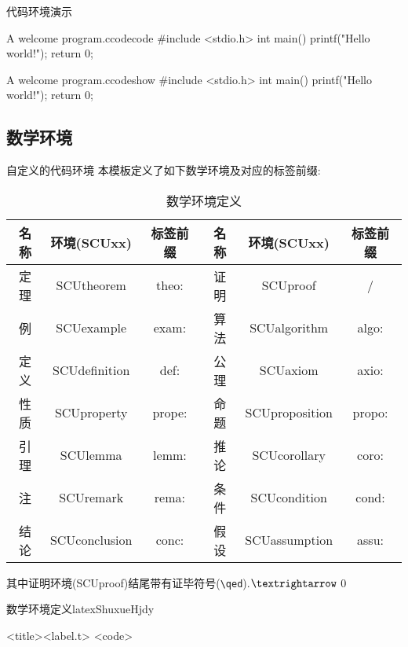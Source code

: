\documentclass[hyperref,UTF8,11pt]{beamer}
\begin{document}
\begin{frame}[fragile]{代码环境演示}
	\begin{SCUcode}[]{A welcome program.}{c}{}{codecode}
		#include <stdio.h>
		int main() {
			printf("Hello world!\n");
			return 0;
		}
	\end{SCUcode}
	\begin{SCUshow}[]{A welcome program.}{c}{}{codeshow}
		#include <stdio.h>
		int main() {
			printf("Hello world!\n");
			return 0;
		}
	\end{SCUshow}
\end{frame}

\subsection{数学环境}
\begin{frame}{自定义的代码环境}
	本模板定义了如下数学环境及对应的标签前缀: 
	\begin{table}[htbp!]
		\centering\scriptsize
		\caption{数学环境定义}
		\label{tab:ShuxueHjdy}
		\begin{tabular}{ccc|ccc}
			\toprule
			名称 & 环境(SCUxx) & 标签前缀 & 名称 & 环境(SCUxx) & 标签前缀 \\
			\midrule
			定理 & \color{JXred}SCUtheorem & theo: & 证明 & \color{JXred}SCUproof & / \\
			例 & \color{JXred}SCUexample & exam: & 算法 & \color{JXred}SCUalgorithm & algo: \\
			定义 & \color{JXred}SCUdefinition & def: & 公理 & \color{JXred}SCUaxiom & axio: \\
			性质 & \color{JXred}SCUproperty & prope: & 命题 & \color{JXred}SCUproposition & propo: \\
			引理 & \color{JXred}SCUlemma & lemm: & 推论 & \color{JXred}SCUcorollary & coro: \\
			注 & \color{JXred}SCUremark & rema: & 条件 & \color{JXred}SCUcondition & cond: \\
			结论 & \color{JXred}SCUconclusion & conc: & 假设 & \color{JXred}SCUassumption & assu: \\
			\bottomrule
		\end{tabular}
	\end{table}
	其中证明环境(SCUproof)结尾带有证毕符号(\verb|\qed|).$\textrightarrow$\qed
	\begin{SCUshow}[comment={%
			\vskip1ex%
			\scriptsize%
			{\color{JXred}<envi>}\quad 环境名称(见\vref{tab:ShuxueHjdy})\\
			{\color{JXred}<keys.t>}\quad 添加到tcolorbox中的参数, 如comment, sidebyside等\\
			{\color{JXred}<title>}\quad 标题\\
			{\color{JXred}<label.t>}\quad 引用标签尾部, 头部已定义(code:), {\color{JXred}SCUproof}环境无该选项\\
			{\color{JXred}<code>}\quad 代码\\
		},%
		listing above comment]{数学环境定义}{latex}{}{ShuxueHjdy}
		\begin{<envi>}[<keys.t>]{<title>}{<label.t>}
			<code>
		\end{<envi>}
	\end{SCUshow}
\end{frame}
\end{document}
